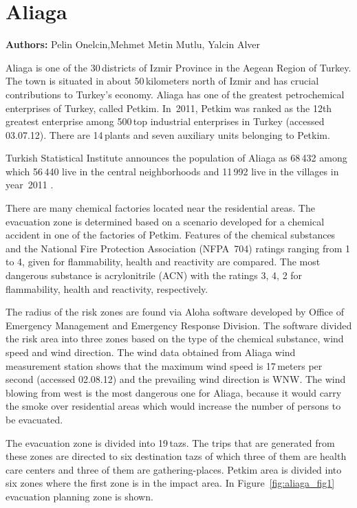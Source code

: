 \chapter{Aliaga}
\label{ch:aliaga}
\hfill \textbf{Authors:} Pelin Onelcin,Mehmet Metin Mutlu, Yalcin Alver

Aliaga is one of the 30\,districts of Izmir Province in the Aegean Region of Turkey. 
The town is situated in about 50\,kilometers north of Izmir and has crucial contributions to Turkey’s economy. 
Aliaga has one of the greatest petrochemical enterprises of Turkey, called Petkim.
In~2011, Petkim was ranked as the 12th greatest enterprise among 500\,top industrial enterprises in Turkey \citep[][]{ICI_Webpage_2012}(accessed 03.07.12). There are 14\,plants and seven auxiliary units belonging to Petkim. 

Turkish Statistical Institute announces the population of Aliaga as 68\,432 among which 56\,440 live in the central neighborhoods and 11\,992 live in the villages in year~2011 \citep[][]{TSI_Webpage_2011}.

There are many chemical factories located near the residential areas. The evacuation zone is determined based on a scenario developed for a chemical accident in one of the factories of Petkim. Features of the chemical substances and the National Fire Protection Association (NFPA~704) ratings ranging from 1 to 4, given for flammability, health and reactivity are compared. The most dangerous substance is acrylonitrile (ACN) with the ratings 3, 4, 2 for flammability, health and reactivity, respectively.

The radius of the risk zones are found via Aloha software developed by Office of Emergency Management and Emergency Response Division. The software divided the risk area into three zones based on the type of the chemical substance, wind speed and wind direction. The wind data obtained from Aliaga wind measurement station shows that the maximum wind speed is 17\,meters per second \citep[][]{Wolfram_Webpage_2012}(accessed 02.08.12) and the prevailing wind direction is WNW. The wind blowing from west is the most dangerous one for Aliaga, because it would carry the smoke over residential areas which would increase the number of persons to be evacuated.

The evacuation zone is divided into 19\,\glspl{taz}. The trips that are generated from these zones are directed to six destination \glspl{taz} of which three of them are health care centers and three of them are gathering-places. Petkim area is divided into six zones where the first zone is in the impact area. In Figure~\ref{fig:aliaga_fig1} evacuation planning zone is shown.

